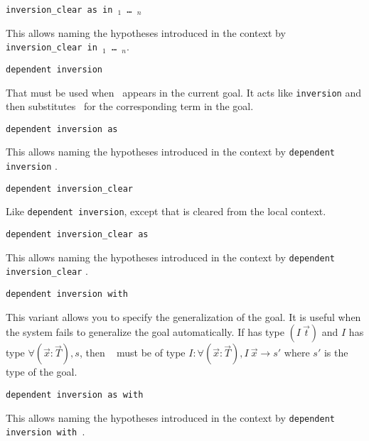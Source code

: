 \begin{coq_example*}
\begin{Variants}
\item {}
  \texttt{inversion\_clear {\ident} as {\intropattern}
  in \ident$_1$ \dots\ \ident$_n$}

  This allows naming the hypotheses introduced in the context by
  \texttt{inversion\_clear {\ident} in \ident$_1$ \dots\ \ident$_n$}.

\item {} \texttt{dependent inversion \ident}

  That must be used when \ident\ appears in the current goal.  It acts
  like \texttt{inversion} and then substitutes \ident\ for the
  corresponding term in the goal.

\item {} \texttt{dependent
    inversion {\ident} as \intropattern}

  This allows naming the hypotheses introduced in the context by
  \texttt{dependent inversion} {\ident}.

\item {} \texttt{dependent
    inversion\_clear \ident}

  Like \texttt{dependent inversion}, except that {\ident} is cleared
  from the local context.

\item {}
  \texttt{dependent inversion\_clear {\ident} as \intropattern}

  This allows naming the hypotheses introduced in the context by
  \texttt{dependent inversion\_clear} {\ident}.

\item {} \texttt{dependent
    inversion {\ident} with \term}

  This variant allows you to specify the generalization of the goal. It
  is useful when the system fails to generalize the goal automatically. If
  {\ident} has type $(I~\vec{t})$ and $I$ has type
  $\forall (\vec{x}:\vec{T}), s$,   then \term~  must be of type
  $I:\forall (\vec{x}:\vec{T}), I~\vec{x}\to s'$ where $s'$ is the
  type of the goal.

\item {}
  \texttt{dependent inversion {\ident} as {\intropattern}
  with \term}

  This allows naming the hypotheses introduced in the context by
  \texttt{dependent inversion {\ident} with \term}.


\end{Variants}
\end{coq_example*}
